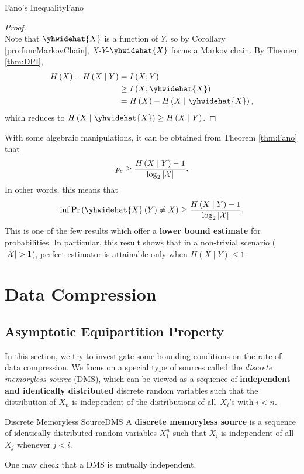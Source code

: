 \documentclass[math]{amznotes}
\theoremstyle{remark}
\begin{document}
\begin{thmbox}{Fano's Inequality}{Fano}
\begin{proof}
\begin{equation*}
        \end{equation*}
        Note that $\yhwidehat{X}$ is a function of $Y$, so by Corollary \ref{pro:funcMarkovChain}, $X$-$Y$-$\yhwidehat{X}$ forms a Markov chain. By Theorem \ref{thm:DPI}, 
        \begin{align*}
            H\left(X\right) - H\left(X \mid Y\right) & = I\left(X ; Y\right) \\
            & \geq I\left(X ; \yhwidehat{X}\right) \\
            & = H\left(X\right) - H\left(X \mid \yhwidehat{X}\right),
        \end{align*}
        which reduces to $H\left(X \mid \yhwidehat{X}\right) \geq H\left(X \mid Y\right)$.
    \end{proof}
\end{thmbox}
With some algebraic manipulations, it can be obtained from Theorem \ref{thm:Fano} that 
\begin{equation*}
    p_e \geq \frac{H\left(X \mid Y\right) - 1}{\log_2{\left\lvert {\mathcal{X}} \right\rvert}}.
\end{equation*}
In other words, this means that 
\begin{equation*}
    \inf \Pr\left(\yhwidehat{X}\left(Y\right) \neq X\right) \geq \frac{H\left(X \mid Y\right) - 1}{\log_2\abs{\mathcal{X}}}.
\end{equation*}
This is one of the few results which offer a \textbf{lower bound estimate} for probabilities. In particular, this result shows that in a non-trivial scenario (${\left\lvert {\mathcal{X}} \right\rvert} > 1$), perfect estimator is attainable only when $H\left(X \mid Y\right) \leq 1$. 

\chapter{Data Compression}
\section{Asymptotic Equipartition Property}
In this section, we try to investigate some bounding conditions on the rate of data compression. We focus on a special type of sources called the \textit{discrete memoryless source} (DMS), which can be viewed as a sequence of \textbf{independent and identically distributed} discrete random variables such that the distribution of $X_n$ is independent of the distributions of all~$X_i$'s with $i < n$. 
\begin{dfnbox}{Discrete Memoryless Source}{DMS}
    A {\color{red} \textbf{discrete memoryless source}} is a sequence of identically distributed random variables $X_1^n$ such that $X_i$ is independent of all $X_j$ whenever $j < i$.
\end{dfnbox}
One may check that a DMS is mutually independent.
\end{document}
